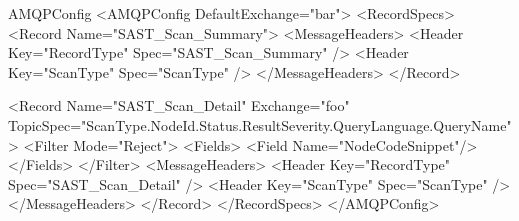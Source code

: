 \begin{xml}{AMQPConfig}{\expandsenv\contentvariables}{}
<AMQPConfig DefaultExchange="bar">
    <RecordSpecs>
        <Record Name="SAST_Scan_Summary">
            <MessageHeaders>
                <Header Key="RecordType" Spec="SAST_Scan_Summary" />
                <Header Key="ScanType" Spec="{ScanType}" />
            </MessageHeaders> 
        </Record>

        <Record 
            Name="SAST_Scan_Detail" 
            Exchange="foo" 
            TopicSpec="{ScanType}.{NodeId}.{Status}.{ResultSeverity}.{QueryLanguage}.{QueryName}">
            <Filter Mode="Reject">
                <Fields>
                    <Field Name="NodeCodeSnippet"/>
                </Fields>
            </Filter>
            <MessageHeaders>
                <Header Key="RecordType" Spec="SAST_Scan_Detail" />
                <Header Key="ScanType" Spec="{ScanType}" />
            </MessageHeaders> 
        </Record>
    </RecordSpecs>
</AMQPConfig>
\end{xml}
    
